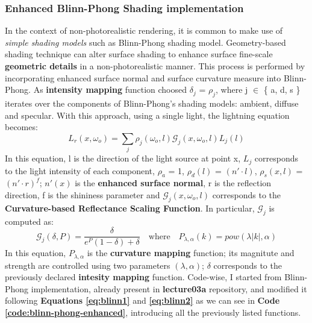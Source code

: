 \subsubsection{Enhanced Blinn-Phong Shading implementation}
In the context of non-photorealistic rendering, it is common to make use of \textit{simple shading models} such as Blinn-Phong shading model. \newline
Geometry-based shading technique can alter surface shading to enhance surface fine-scale \textbf{geometric details} in a non-photorealistic manner. This process is performed by incorporating enhanced surface normal and surface curvature measure into Blinn-Phong.
\newline
As \textbf{intensity mapping} function \cite{referencePaper} choosed $\delta_j$ = $\rho_j$, where j $\in$ \{ a, d, s \} iterates over the components of Blinn-Phong's shading models: ambient, diffuse and specular. \newline
With this approach, using a single light, the lightning equation becomes:
\begin{equation}\label{eq:blinn1}
	L_r(x,\omega_o) = \sum_j \rho_j(\omega_o,l) \mathcal{G}_j(x,\omega_o,l) L_j(l)
\end{equation}
In this equation, l is the direction of the light source at point x, $L_j$ corresponds to the light intensity of each component, $\rho_a$ = 1, $\rho_d(l)$ = $(n'\cdot  l)$, $\rho_s(x,l)$ = $(n'\cdot  r)^f$; \newline
$n'(x)$ is the \textbf{enhanced surface normal}, r is the reflection direction, f is the shininess parameter and $\mathcal{G}_j(x,\omega_o,l)$ corresponds to the \textbf{Curvature-based Reflectance Scaling Function}. \newline
In particular, $\mathcal{G}_j$ is computed as:
\begin{equation}\label{eq:blinn2}
	\mathcal{G}_j(\delta, P) = \frac{\delta}{e^P (1-\delta) + \delta}\quad\mathrm{where}\quad  P_{\lambda,\alpha}(k) = pow(\lambda |k|, \alpha)
\end{equation}
In this equation, $P_{\lambda,\alpha}$ is the \textbf{curvature mapping} function; its magnitute and strength are controlled using two parameters $(\lambda,\alpha)$; $\delta$ corresponds to the previously declared \textbf{intesity mapping} function.\newline
Code-wise, I started from Blinn-Phong implementation, already present in \textbf{lecture03a} repository, and modified it following \textbf{Equations \ref{eq:blinn1}} and \textbf{\ref{eq:blinn2}} as we can see in \textbf{Code \ref{code:blinn-phong-enhanced}}, introducing all the previously listed functions. \newline
